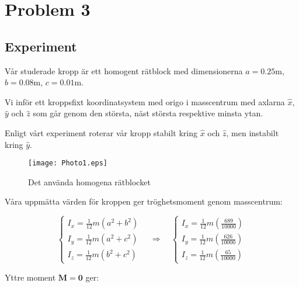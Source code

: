 \documentclass[12pt,a4paper]{article}
\begin{document}
\section{Problem 3}
	
	
	\subsection{Experiment}
		
		Vår studerade kropp är ett homogent rätblock med dimensionerna
		$a = 0.25 \mathrm{m}$, $b = 0.08 \mathrm{m}$, $c = 0.01 \mathrm{m}$.
		
		Vi inför ett kroppsfixt koordinatsystem med origo i masscentrum med axlarna
		$\hat{x}$, $\hat{y}$ och $\hat{z}$ som går genom den största, näst
		största respektive minsta ytan.
		
		Enligt vårt experiment roterar vår kropp stabilt kring $\hat{x}$ och $\hat{z}$, men
		instabilt kring $\hat{y}$.
		
		\begin{figure}
			\begin{center}
				\texttt{[image: Photo1.eps]}
				\caption{Det använda homogena rätblocket}
			\end{center}
		\end{figure}
		
		Våra uppmätta värden för kroppen ger tröghetsmoment genom masscentrum:
		
		\begin{equation*}
			\begin{cases}
				I_x = \frac{1}{12} m (a^2 + b^2) \\
				I_y = \frac{1}{12} m (a^2 + c^2) \\
				I_z = \frac{1}{12} m (b^2 + c^2) 
			\end{cases}
			\hspace{12pt}
			\Rightarrow
			\hspace{12pt}
			\begin{cases}
				I_x = \frac{1}{12} m (\frac{689}{10000}) \\
				I_y = \frac{1}{12} m (\frac{626}{10000}) \\
				I_z = \frac{1}{12} m (\frac{65}{10000})
			\end{cases}
		\end{equation*}
		
		Yttre moment $\mathbf{M}=\mathbf{0}$ ger:
		
\end{document}
